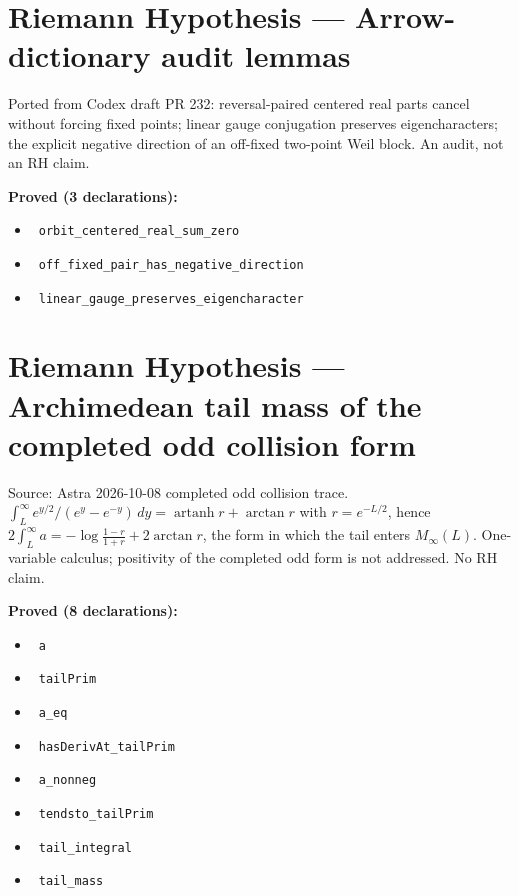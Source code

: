 \documentclass{report}
\theoremstyle{definition}
\begin{document}
\section{Riemann Hypothesis --- Arrow-dictionary audit lemmas}
Ported from Codex draft PR 232: reversal-paired centered real parts cancel without forcing fixed points; linear gauge conjugation preserves eigencharacters; the explicit negative direction of an off-fixed two-point Weil block. An audit, not an RH claim.

\noindent\textbf{Proved (3 declarations):}
\begin{itemize}
  \item {}\leanok\ \texttt{orbit\_centered\_real\_sum\_zero}
  \item {}\leanok\ \texttt{off\_fixed\_pair\_has\_negative\_direction}
  \item {}\leanok\ \texttt{linear\_gauge\_preserves\_eigencharacter}
\end{itemize}

\section{Riemann Hypothesis --- Archimedean tail mass of the completed odd collision form}
Source: Astra 2026-10-08 completed odd collision trace. $\int_L^\infty e^{y/2}/(e^y-e^{-y})\,dy=\operatorname{artanh}r+\arctan r$ with $r=e^{-L/2}$, hence $2\int_L^\infty a=-\log\frac{1-r}{1+r}+2\arctan r$, the form in which the tail enters $M_\infty(L)$. One-variable calculus; positivity of the completed odd form is not addressed. No RH claim.

\noindent\textbf{Proved (8 declarations):}
\begin{itemize}
  \item {}\leanok\ \texttt{a}
  \item {}\leanok\ \texttt{tailPrim}
  \item {}\leanok\ \texttt{a\_eq}
  \item {}\leanok\ \texttt{hasDerivAt\_tailPrim}
  \item {}\leanok\ \texttt{a\_nonneg}
  \item {}\leanok\ \texttt{tendsto\_tailPrim}
  \item {}\leanok\ \texttt{tail\_integral}
  \item {}\leanok\ \texttt{tail\_mass}
\end{itemize}
\end{document}
